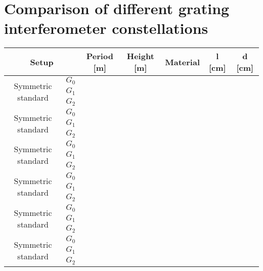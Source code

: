 \chapter{Comparison of different grating interferometer constellations}\label{gcomp}

\begin{table}[h] 
	\begin{center}	
		\begin{tabular}{c|c|c|c|c|c|c}
		\multicolumn{2}{c|}{Setup} & Period [\text{$\mu$}m] & Height [\text{$\mu$}m] & Material & l [cm] & d [cm] \\ \hline \hline
		\multirow{3}{18 mm}{Symmetric standard} \rule{0pt}{13pt} & $G_{0}$ &  &  &&  &    \\ \cline{2-7}
										        \rule{0pt}{13pt}& $G_{1}$ & & & & &  	 \\ \cline{2-7} 
											    \rule{0pt}{13pt}& $G_{2}$ & & & && 		 \\ \hline
		\multirow{3}{18 mm}{Symmetric standard} \rule{0pt}{13pt}& $G_{0}$ & & &&  &    \\ \cline{2-7}
											    \rule{0pt}{13pt}& $G_{1}$ & & & & &   	\\ \cline{2-7} 
											    \rule{0pt}{13pt}& $G_{2}$ & & & &&  \\ \hline
		\multirow{3}{18 mm}{Symmetric standard} \rule{0pt}{13pt}& $G_{0}$ & & &&  &    \\ \cline{2-7}
												\rule{0pt}{13pt}& $G_{1}$ & & & & &   	\\ \cline{2-7} 
												\rule{0pt}{13pt}& $G_{2}$ & & & &&  \\ \hline    
		\multirow{3}{18 mm}{Symmetric standard}	\rule{0pt}{13pt}& $G_{0}$ & & &&  &    \\ \cline{2-7}
											    \rule{0pt}{13pt}& $G_{1}$ & & & & &   	\\ \cline{2-7} 
											    \rule{0pt}{13pt}& $G_{2}$ & & & &&  \\ \hline    
		\multirow{3}{18 mm}{Symmetric standard} \rule{0pt}{13pt}& $G_{0}$ & & &&  &    \\ \cline{2-7}
												\rule{0pt}{13pt}& $G_{1}$ & & & & &   	\\ \cline{2-7} 
												\rule{0pt}{13pt}& $G_{2}$ & & & &&  \\ \hline    
		\multirow{3}{18 mm}{Symmetric standard} \rule{0pt}{13pt}& $G_{0}$ & & &&  &    \\ \cline{2-7}
												\rule{0pt}{13pt}& $G_{1}$ & & & & &   	\\ \cline{2-7} 
												\rule{0pt}{13pt}& $G_{2}$ & & & &&  \\        
  

\end{tabular}
\end{center}
\end{table}
